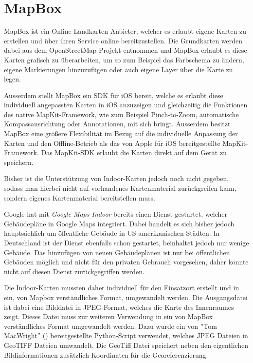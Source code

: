 \section{MapBox}
\label{sec:sec:technologies:mapbox}
MapBox ist ein Online-Landkarten Anbieter, welcher es erlaubt eigene Karten zu erstellen und über ihren Service online bereitzustellen. 
Die Grundkarten werden dabei aus dem OpenStreetMap-Projekt entnommen und MapBox erlaubt es diese Karten grafisch zu überarbeiten, um so zum Beispiel das Farbschema zu ändern, eigene Markierungen hinzuzufügen oder auch eigene Layer über die Karte zu legen.

Ausserdem stellt MapBox ein SDK für iOS bereit, welche es erlaubt diese individuell angepassten Karten in iOS anzuzeigen und gleichzeitig die Funktionen des native MapKit-Framework, wie zum Beispiel Pinch-to-Zoom, automatische Kompassausrichtung oder Annotationen, mit sich bringt. Ausserdem besitzt MapBox eine größere Flexibilität im Bezug auf die individuelle Anpassung der Karten und den Offline-Betrieb als das von Apple für iOS bereitgestellte MapKit-Framework. Das MapKit-SDK erlaubt die Karten direkt auf dem Gerät zu speichern.

Bisher ist die Unterstützung von Indoor-Karten jedoch noch nicht gegeben, sodass man hierbei nicht auf vorhandenes Kartenmaterial zurückgreifen kann, sondern eigenes Kartenmaterial bereitstellen muss.

Google hat mit \emph{Google Maps Indoor} bereits einen Dienst gestartet, welcher Gebäudepläne in Google Maps integriert. Dabei handelt es sich bisher jedoch hauptsächlich um öffentliche Gebäude in US-amerikanischen Städten. In Deutschland ist der Dienst ebenfalls schon gestartet, beinhaltet jedoch nur wenige Gebäude. Das hinzufügen von neuen Gebäudeplänen ist nur bei öffentlichen Gebäuden möglich und nicht für den privaten Gebrauch vorgesehen, daher konnte nicht auf diesen Dienst zurückgegriffen werden.

Die Indoor-Karten mussten daher individuell für den Einsatzort erstellt und in ein, von Mapbox verständliches Format, umgewandelt werden.
Die Ausgangsdatei ist dabei eine Bilddatei in JPEG-Format, welches die Karte des Innenraumes zeigt. Dieses Datei muss zur weiteren Verwendung in ein von MapBox verständliches Format umgewandelt werden. 
Dazu wurde ein von ''Tom MacWright'' (\citet{jpgtogeo}) bereitgestellte Python-Script verwendet, welches JPEG Dateien in GeoTIFF Dateien umwandelt. Die GeoTiff Datei speichert neben den eigentlichen Bildinformationen zusätzlich Koordinaten für die Georeferenzierung. \citet{geotiff}


